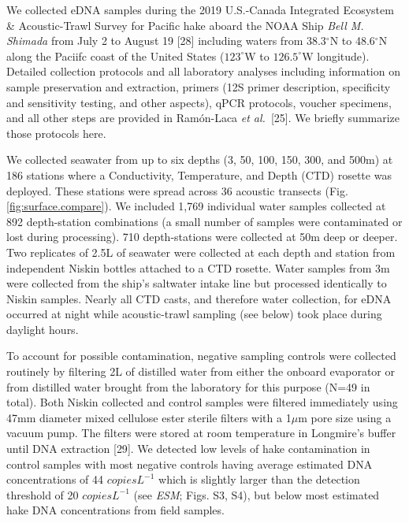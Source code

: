 \documentclass[
]{article}
\begin{document}
We collected eDNA samples during the 2019 U.S.-Canada Integrated
Ecosystem \& Acoustic-Trawl Survey for Pacific hake aboard the NOAA Ship
\emph{Bell M. Shimada} from July 2 to August 19 {[}28{]} including waters from 38.3\(^{\circ}\)N to
48.6\(^{\circ}\)N along the Paciifc coast of the United States 
($123^{\circ}$W to $126.5^{\circ}$W longitude). Detailed collection protocols and 
all laboratory analyses including information on sample preservation and extraction, 
primers (12S primer description, specificity and sensitivity testing, and other aspects), 
qPCR protocols, voucher specimens, and all other steps are provided in Ram\'on-Laca \textit{et al.}~{[}25{]}. 
We briefly summarize those protocols here.

We collected seawater from up to six depths (3, 50, 100, 150, 300, and
500m) at 186 stations where a Conductivity, Temperature, and Depth (CTD)
rosette was deployed. These stations were spread across 36 acoustic
transects (Fig. \ref{fig:surface.compare}). We included 1,769 individual
water samples collected at 892 depth-station combinations (a small
number of samples were contaminated or lost during processing). 710
depth-stations were collected at 50m deep or deeper. Two replicates of
2.5L of seawater were collected at each depth and station from
independent Niskin bottles attached to a CTD rosette. Water samples from
3m were collected from the ship's saltwater intake line but processed
identically to Niskin samples. Nearly all CTD casts, and therefore water
collection, for eDNA occurred at night while acoustic-trawl sampling (see
below) took place during daylight hours.

To account for possible contamination, negative sampling controls were
collected routinely by filtering 2L of distilled water from either the
onboard evaporator or from distilled water brought from the laboratory
for this purpose (N=49 in total). Both Niskin collected and control samples 
were filtered immediately using 47mm diameter mixed cellulose ester sterile
filters with a 1\(\mu\)m pore size using a vacuum pump. The filters
were stored at room temperature in Longmire's buffer until DNA
extraction {[}29{]}. We detected low levels of hake contamination in control 
samples with most negative controls having average estimated DNA concentrations of 44 $copies L^{-1}$
which is slightly larger than the detection threshold of 20 $copies L^{-1}$ (see \emph{ESM}; Figs. S3, S4), 
but below most estimated hake DNA concentrations from field samples.
\end{document}

